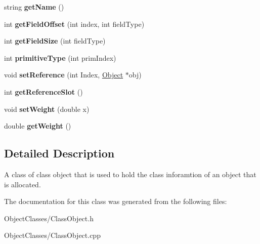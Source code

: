 \begin{DoxyCompactItemize}
\item 
\hypertarget{classtrace_gen_1_1_class_object_a4d0acdbf7e8065a0f59891da6e080ab4}{}string {\bfseries get\+Name} ()\label{classtrace_gen_1_1_class_object_a4d0acdbf7e8065a0f59891da6e080ab4}

\item 
\hypertarget{classtrace_gen_1_1_class_object_adcd7f9628bc93a759a0f84e1ee71fc20}{}int {\bfseries get\+Field\+Offset} (int index, int field\+Type)\label{classtrace_gen_1_1_class_object_adcd7f9628bc93a759a0f84e1ee71fc20}

\item 
\hypertarget{classtrace_gen_1_1_class_object_aa211c580277b749eece42280ec0bb3c7}{}int {\bfseries get\+Field\+Size} (int field\+Type)\label{classtrace_gen_1_1_class_object_aa211c580277b749eece42280ec0bb3c7}

\item 
\hypertarget{classtrace_gen_1_1_class_object_a1516bb81a792b01d9ca6ad37c851b71c}{}int {\bfseries primitive\+Type} (int prim\+Index)\label{classtrace_gen_1_1_class_object_a1516bb81a792b01d9ca6ad37c851b71c}

\item 
\hypertarget{classtrace_gen_1_1_class_object_a733d19567c316baf92d7fa7ce4281951}{}void {\bfseries set\+Reference} (int Index, \hyperlink{classtrace_gen_1_1_object}{Object} $\ast$obj)\label{classtrace_gen_1_1_class_object_a733d19567c316baf92d7fa7ce4281951}

\item 
\hypertarget{classtrace_gen_1_1_class_object_a161559a9799b90592366356221ec4fd9}{}int {\bfseries get\+Reference\+Slot} ()\label{classtrace_gen_1_1_class_object_a161559a9799b90592366356221ec4fd9}

\item 
\hypertarget{classtrace_gen_1_1_class_object_a43902608d544206b519656469eae1626}{}void {\bfseries set\+Weight} (double x)\label{classtrace_gen_1_1_class_object_a43902608d544206b519656469eae1626}

\item 
\hypertarget{classtrace_gen_1_1_class_object_aa4970d64056b748c4cd59b469dbed632}{}double {\bfseries get\+Weight} ()\label{classtrace_gen_1_1_class_object_aa4970d64056b748c4cd59b469dbed632}

\end{DoxyCompactItemize}


\subsection{Detailed Description}
A class of class object that is used to hold the class inforamtion of an object that is allocated. 

The documentation for this class was generated from the following files\+:\begin{DoxyCompactItemize}
\item 
Object\+Classes/Class\+Object.\+h\item 
Object\+Classes/Class\+Object.\+cpp\end{DoxyCompactItemize}
